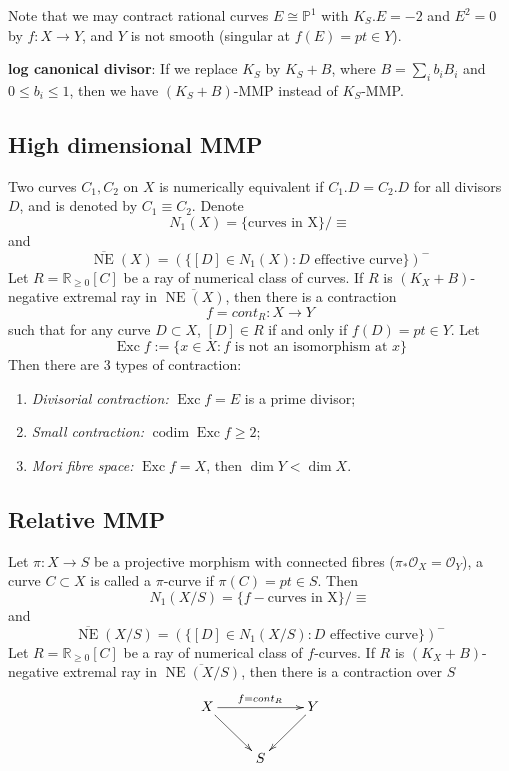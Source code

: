 \documentclass{article}
\begin{document}
Note that we may contract rational curves $E\cong \mathbb{P}^{1}$ with $K_{S}.E=-2$ and $E^{2}=0$ by $f:X\to Y$, and $Y$ is not smooth (singular at $f(E)=pt\in Y$).

\textbf{log canonical divisor}:
If we replace $K_{S}$ by $K_{S}+B$, where $B=\sum_{i}b_{i}B_{i}$ and $0\leqslant b_{i} \leqslant 1$, then we have $(K_{S}+B)$-MMP instead of $K_{S}$-MMP.
\subsection{High dimensional MMP}
Two curves $C_{1},C_{2}$ on $X$ is numerically equivalent if $C_{1}.D=C_{2}.D$ for all divisors $D$, and is denoted by $C_{1}\equiv C_{2}$. Denote
\[
	N_{1}(X)=\{\text{curves in X}\}/\equiv
\]
and
\[
	\overline{\operatorname{NE}}(X)=(\{[D]\in N_{1}(X):D \text{ effective curve}\})^{-}
\]
Let $R=\mathbb{R}_{\geqslant 0}[C]$ be a ray of numerical class of curves. If $R$ is $(K_{X}+B)$-negative extremal ray in $\overline{\operatorname{NE}(X)}$, then there is a contraction
\[
	f=cont_{R}:X \to Y
\]
such that for any curve $D \subset X$, $[D]\in R$ if and only if $f(D)=pt\in Y$. Let
\[
	\operatorname{Exc}f:=\{x\in X: f \text{ is not an isomorphism at } x\}
\]
Then there are 3 types of contraction:
\begin{enumerate}
	\item \emph{Divisorial contraction:} $\operatorname{Exc}f=E$ is a prime divisor;
	\item \emph{ Small contraction:} $\operatorname{codim} \operatorname{Exc}f \geqslant 2$;
	\item \emph{Mori fibre space:} $\operatorname{Exc}f=X$, then $\dim Y < \dim X$.
\end{enumerate}

\subsection{Relative MMP}
Let $\pi:X\to S$ be a projective morphism with connected fibres ($\pi_*\mathcal{O}_{X}=\mathcal{O}_{Y}$), a curve $C \subset X$ is called a $\pi$-curve if $\pi(C)=pt\in S$. Then
\[
	N_{1}(X/S)=\{f-\text{curves in X}\}/\equiv
\]
and
\[
	\overline{\operatorname{NE}}(X/S)=(\{[D]\in N_{1}(X/S):D \text{ effective curve}\})^{-}
\]
Let $R=\mathbb{R}_{\geqslant 0}[C]$ be a ray of numerical class of $f$-curves. If $R$ is $(K_{X}+B)$-negative extremal ray in $\overline{\operatorname{NE}(X/S)}$, then there is a contraction over $S$
\[
	\xymatrix{
	X\ar[rr]^{f=cont_{R}}\ar[rd]& &Y\ar[ld] \\
	& S &
	}
\]
\end{document}
